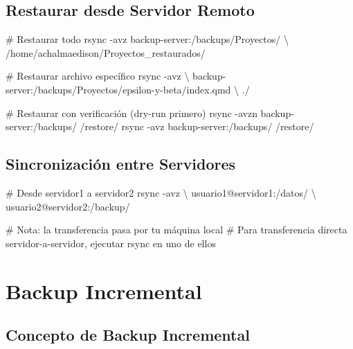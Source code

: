 \documentclass[
  doc,
  floatsintext,
  longtable,
  a4paper,
  nolmodern,
  notxfonts,
  notimes,
  12pt,
  colorlinks=true,linkcolor=blue,citecolor=blue,urlcolor=blue]{apa7}
\newenvironment{Shaded}{\begin{snugshade}}{\end{snugshade}}
\newcommand{\AttributeTok}[1]{\textcolor[rgb]{0.40,0.45,0.13}{#1}}
\newcommand{\CommentTok}[1]{\textcolor[rgb]{0.37,0.37,0.37}{#1}}
\newcommand{\DataTypeTok}[1]{\textcolor[rgb]{0.68,0.00,0.00}{#1}}
\newcommand{\FunctionTok}[1]{\textcolor[rgb]{0.28,0.35,0.67}{#1}}
\newcommand{\NormalTok}[1]{\textcolor[rgb]{0.00,0.23,0.31}{#1}}
\begin{document}
\subsection{Restaurar desde Servidor
Remoto}\label{restaurar-desde-servidor-remoto}

\begin{Shaded}
\begin{Highlighting}[]
\CommentTok{\# Restaurar todo}
\FunctionTok{rsync} \AttributeTok{{-}avz}\NormalTok{ backup{-}server:/backups/Proyectos/ }\DataTypeTok{\textbackslash{}}
\NormalTok{  /home/achalmaedison/Proyectos\_restaurados/}

\CommentTok{\# Restaurar archivo específico}
\FunctionTok{rsync} \AttributeTok{{-}avz} \DataTypeTok{\textbackslash{}}
\NormalTok{  backup{-}server:/backups/Proyectos/epsilon{-}y{-}beta/index.qmd }\DataTypeTok{\textbackslash{}}
\NormalTok{  ./}

\CommentTok{\# Restaurar con verificación (dry{-}run primero)}
\FunctionTok{rsync} \AttributeTok{{-}avzn}\NormalTok{ backup{-}server:/backups/ /restore/}
\FunctionTok{rsync} \AttributeTok{{-}avz}\NormalTok{ backup{-}server:/backups/ /restore/}
\end{Highlighting}
\end{Shaded}

\subsection{Sincronización entre
Servidores}\label{sincronizaciuxf3n-entre-servidores}

\begin{Shaded}
\begin{Highlighting}[]
\CommentTok{\# Desde servidor1 a servidor2}
\FunctionTok{rsync} \AttributeTok{{-}avz} \DataTypeTok{\textbackslash{}}
\NormalTok{  usuario1@servidor1:/datos/ }\DataTypeTok{\textbackslash{}}
\NormalTok{  usuario2@servidor2:/backup/}

\CommentTok{\# Nota: la transferencia pasa por tu máquina local}
\CommentTok{\# Para transferencia directa servidor{-}a{-}servidor, ejecutar rsync en uno de ellos}
\end{Highlighting}
\end{Shaded}

\section{Backup Incremental}\label{backup-incremental}

\subsection{Concepto de Backup
Incremental}\label{concepto-de-backup-incremental}
\end{document}
